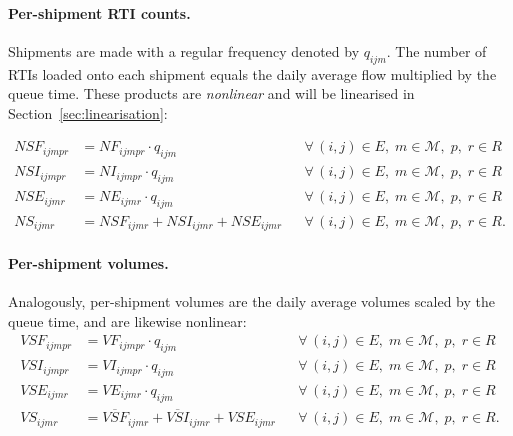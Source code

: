 
\paragraph{Per-shipment RTI counts.}
Shipments are made with a regular frequency denoted by $q_{ijm}$. The number of RTIs loaded
onto each shipment equals the daily average flow
multiplied by the queue time. These products are \emph{nonlinear}
and will be linearised in Section~\ref{sec:linearisation}:

\begin{align}
  NSF_{ijmpr} &= {NF}_{ijmpr}\cdot q_{ijm}
  && \forall\,(i,j)\in E,\;m\in\mathcal{M},\;p,\;r\in R
  \label{eq:ship-NF}\\
  NSI_{ijmpr} &= {NI}_{ijmpr}\cdot q_{ijm}
  && \forall\,(i,j)\in E,\;m\in\mathcal{M},\;p,\;r\in R
  \label{eq:ship-NI}\\
  NSE_{ijmr} &= NE_{ijmr}\cdot q_{ijm}
  && \forall\,(i,j)\in E,\;m\in\mathcal{M},\;p,\;r\in R
  \label{eq:ship-NE}\\
  NS_{ijmr}  &= NSF_{ijmr}+NSI_{ijmr}+NSE_{ijmr}
  && \forall\,(i,j)\in E,\;m\in\mathcal{M},\;p,\;r\in R.
  \label{eq:ship-N}
\end{align}


\paragraph{Per-shipment volumes.}
Analogously, per-shipment volumes are the daily average volumes
scaled by the queue time, and are likewise nonlinear:
%
\begin{align}
  VSF_{ijmpr} &= VF_{ijmpr}\cdot q_{ijm}
  && \forall\,(i,j)\in E,\;m\in\mathcal{M},\;p,\;r\in R
  \label{eq:ship-VF}\\
  VSI_{ijmpr} &= VI_{ijmpr}\cdot q_{ijm}
  && \forall\,(i,j)\in E,\;m\in\mathcal{M},\;p,\;r\in R
  \label{eq:ship-VI}\\
  VSE_{ijmr} &= VE_{ijmr}\cdot q_{ijm}
  && \forall\,(i,j)\in E,\;m\in\mathcal{M},\;p,\;r\in R
  \label{eq:ship-VE}\\
  VS_{ijmr}  &= \overline{VSF}_{ijmr}+\overline{VSI}_{ijmr}+VSE_{ijmr}
  && \forall\,(i,j)\in E,\;m\in\mathcal{M},\;p,\;r\in R.
  \label{eq:ship-VS}
\end{align}

